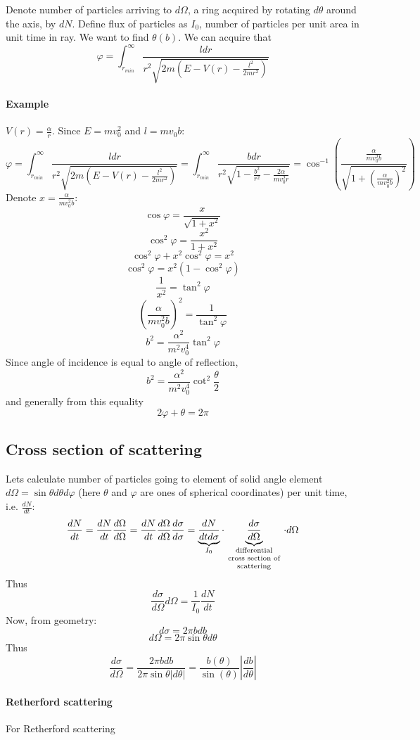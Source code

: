Denote number of particles arriving to $d\Omega$, a ring acquired by rotating $d\theta$ around the axis, by $dN$. Define flux of particles as $I_0$, number of particles per unit area in unit time in ray. We want to find $\theta(b)$. We can acquire that 
$$\varphi = \int_{r_{min}}^\infty \frac{l dr}{r^2 \sqrt{2m \left(E-V(r)-\frac{l^2}{2mr^2}\right)}}$$
\paragraph{Example}
$V(r) = \frac{\alpha}{r}$. Since $E=mv_0^2$ and $l=mv_0b$:
$$\varphi = \int_{r_{min}}^\infty \frac{l dr}{r^2 \sqrt{2m \left(E-V(r)-\frac{l^2}{2mr^2}\right)}} = \int_{r_{min}}^\infty \frac{b dr}{r^2 \sqrt{1-\frac{b^2}{r^2}-\frac{2\alpha }{mv_0^2 r}}} = \cos^{-1} \left(\frac{\frac{\alpha }{mv_0^2b}}{\sqrt{1+\left(\frac{\alpha }{mv_0^2b}\right)^2}}\right)$$
Denote $x=\frac{\alpha}{mv_0^2b}$:
$$\cos \varphi  =  \frac{x}{\sqrt{1+x^2}}$$
$$\cos^2 \varphi  =  \frac{x^2}{1+x^2}$$
$$\cos^2 \varphi + x^2\cos^2 \varphi  =  x^2$$
$$\cos^2 \varphi = x^2(1-\cos^2\varphi)$$
$$\frac{1}{x^2} = \tan^2 \varphi $$
$$\left(\frac{\alpha}{mv_0^2b}\right)^2 = \frac{1}{\tan^2 \varphi }$$
$$b^2 = \frac{\alpha^2}{m^2v_0^4}\tan^2 \varphi$$
Since angle of incidence is equal to angle of reflection, 
$$b^2 = \frac{\alpha^2}{m^2v_0^4}\cot^2 \frac{\theta}{2}$$
and generally from this equality
$$2\varphi + \theta = 2\pi$$
\subsection{Cross section of scattering}
Lets calculate number of particles going to element of solid angle element $d\Omega=\sin \theta d\theta d\varphi$ (here $\theta$ and $\varphi$ are ones of spherical coordinates) per unit time, i.e. $\frac{dN}{dt}$:
$$\frac{dN}{dt} = \frac{dN}{dt} \frac{d\Omega}{d\Omega} = \frac{dN}{dt} \frac{d\Omega}{d\Omega} \frac{d\sigma}{d\sigma} = \underbrace{\frac{dN}{dt d\sigma}}_{I_0} \cdot \underbrace{\frac{d\sigma}{d\Omega}}_{\parbox{2cm}{\scriptsize \centering differential cross section of scattering}} \cdot d\Omega$$
Thus
$$\frac{d\sigma}{d\Omega} d\Omega = \frac{1}{I_0}\frac{dN}{dt}$$
Now, from geometry:
$$d\sigma = 2\pi b db$$
$$d\Omega = 2\pi \sin \theta d\theta$$
Thus
$$\frac{d\sigma}{d\Omega} = \frac{2\pi b db}{2\pi \sin \theta |d\theta|} = \frac{b(\theta)}{\sin(\theta)} \left|\frac{db}{d\theta}\right|$$
\paragraph{Retherford scattering}
For Retherford scattering

